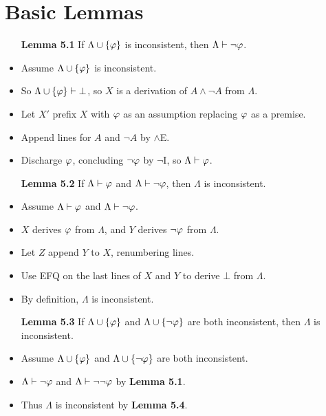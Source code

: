 \documentclass[a4paper, 11pt]{article} %
\begin{document}
\section*{Basic Lemmas}

\begin{itemize}
  \item[\bf Lemma 5.1] If $\Lambda\cup\lbrace\varphi\rbrace$ is inconsistent, then $\Lambda\vdash\neg\varphi$.
    \item Assume $\Lambda\cup\lbrace\varphi\rbrace$ is inconsistent.
    \item So $\Lambda\cup\lbrace\varphi\rbrace \vdash \bot$, so $X$ is a derivation of $A \wedge \neg A$ from $\Lambda$.
    \item Let $X'$ prefix $X$ with $\varphi$ as an assumption replacing $\varphi$ as a premise.
    \item Append lines for $A$ and $\neg A$ by $\wedge$E. 
    \item Discharge $\varphi$, concluding $\neg \varphi$ by $\neg$I, so $\Lambda \vdash \varphi$. 
  \item[\bf Lemma 5.2] If $\Lambda\vdash\varphi$ and $\Lambda\vdash\neg\varphi$, then $\Lambda$ is inconsistent.
    \item Assume $\Lambda\vdash\varphi$ and $\Lambda\vdash\neg\varphi$.
    \item $X$ derives $\varphi$ from $\Lambda$, and $Y$ derives $\neg\varphi$ from $\Lambda$. 
    \item Let $Z$ append $Y$ to $X$, renumbering lines.
    \item Use EFQ on the last lines of $X$ and $Y$ to derive $\bot$ from $\Lambda$. 
    \item By definition, $\Lambda$ is inconsistent.
  \item[\bf Lemma 5.3] If $\Lambda \cup \lbrace\varphi\rbrace$ and $\Lambda\cup \lbrace\neg\varphi\rbrace$ are both inconsistent, then $\Lambda$ is inconsistent.
    \item Assume $\Lambda \cup \lbrace\varphi\rbrace$ and $\Lambda\cup \lbrace\neg\varphi\rbrace$ are both inconsistent.
    \item $\Lambda\vdash \neg\varphi$ and $\Lambda\vdash\neg\neg\varphi$ by \textbf{Lemma 5.1}.
    \item Thus $\Lambda$ is inconsistent by \textbf{Lemma 5.4}. 
\end{itemize}
\end{document}
